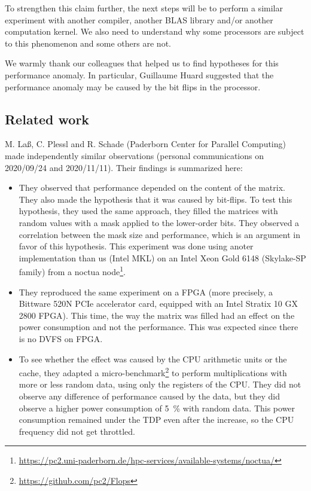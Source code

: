             To strengthen this claim further, the next steps will be to perform a similar experiment with another
            compiler, another BLAS library and/or another computation kernel. We also need to understand why some
            processors are subject to this phenomenon and some others are not.

            We warmly thank our colleagues that helped us to find hypotheses for this performance anomaly. In
            particular, Guillaume Huard suggested that the performance anomaly may be caused by the bit flips in the
            processor.

        \subsection{Related work}%
            M. La{\ss}, C. Plessl and R. Schade (Paderborn Center for Parallel Computing) made independently similar
            observations (personal communications on 2020/09/24 and 2020/11/11). Their findings is summarized here:
            \begin{itemize}
                \item They observed that \dgemm performance depended on the content of the matrix. They also
                    made the hypothesis that it was caused by bit-flips. To test this hypothesis, they used the same
                    approach, they filled the matrices with random values with a mask applied to the lower-order bits.
                    They observed a correlation between the mask size and \dgemm performance, which is an
                    argument in favor of this hypothesis. This experiment was done using anoter \dgemm
                    implementation than us (Intel MKL) on an Intel Xeon Gold 6148 (Skylake-SP family) from a noctua
                    node\footnote{\url{https://pc2.uni-paderborn.de/hpc-services/available-systems/noctua/}}.
                \item They reproduced the same experiment on a FPGA (more precisely, a Bittware 520N PCIe accelerator
                    card, equipped with an Intel Stratix 10 GX 2800 FPGA). This time, the way the matrix was filled had
                    an effect on the power consumption and not the performance. This was expected since there is no DVFS
                    on FPGA.
                \item To see whether the effect was caused by the CPU arithmetic units or the cache, they adapted a
                    micro-benchmark\footnote{\url{https://github.com/pc2/Flops}} to perform multiplications with more or
                    less random data, using only the registers of the CPU. They did not observe any difference of
                    performance caused by the data, but they did observe a higher power consumption of \SI{5}{\percent}
                    with random data. This power consumption remained under the TDP even after the increase, so the CPU
                    frequency did not get throttled.
            \end{itemize}

